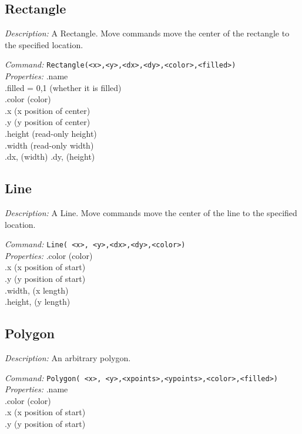 \subsection{Rectangle}
\emph{Description:} A Rectangle. Move commands move the center
  of the rectangle to the specified location.

\emph{Command:}  \verb+Rectangle(<x>,<y>,<dx>,<dy>,<color>,<filled>)+\\

\emph{Properties:}
.name\\
.filled = {0,1} (whether it is filled)\\
.color (color) \\
.x  (x position of center) \\
.y  (y position of center)\\
.height (read-only height)\\
.width (read-only width)\\
.dx, (width)
.dy,  (height)\\



\subsection{Line}
\emph{Description:} A Line. Move commands move the center
  of the line to the specified location.

\emph{Command:}  \verb+Line( <x>, <y>,<dx>,<dy>,<color>)+\\

\emph{Properties:}
.color (color) \\
.x  (x position of start) \\
.y  (y position of start)\\
.width, (x length)\\
.height,  (y length)\\




\subsection{Polygon}
\emph{Description:} An arbitrary polygon. 

\emph{Command:}  \verb+Polygon( <x>, <y>,<xpoints>,<ypoints>,<color>,<filled>)+\\

\emph{Properties:}
.name\\
.color (color) \\
.x  (x position of start) \\
.y  (y position of start)\\

